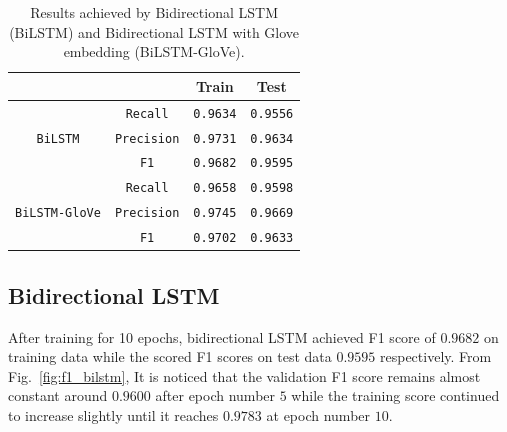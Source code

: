 \documentclass[sigconf, nonacm, natbib, screen, balance=False]{acmart}
\begin{document}
\begin{table}
  \caption{Results achieved by Bidirectional LSTM (BiLSTM) and Bidirectional LSTM with Glove embedding (BiLSTM-GloVe).}
  \label{tbl:results_compare}
  \begin{tabular}{c|c|c|c}  
    \hline
    \verb!! & \verb!! & Train  & Test \\\hline
    \verb!! & \verb!Recall! & \verb!0.9634!  & \verb!0.9556! \\
    \verb!BiLSTM! & \verb!Precision!  & \verb!0.9731! & \verb!0.9634! \\
    \verb!! & \verb!F1! & \verb!0.9682!  & \verb!0.9595!\\\hline
    \verb!! & \verb!Recall! & \verb!0.9658!  & \verb!0.9598! \\
    \verb!BiLSTM-GloVe! &  \verb!Precision! & \verb!0.9745!  & \verb!0.9669! \\
    \verb!! &  \verb!F1! & \verb!0.9702! & \verb!0.9633!  \\\hline
  \end{tabular}
\end{table}

\subsection{Bidirectional LSTM}
After training for 10 epochs, bidirectional LSTM achieved F1 score of $0.9682$ on training data while the scored F1 scores on test data  $0.9595$ respectively. From Fig.~\ref{fig:f1_bilstm}, It is noticed that the validation F1 score remains almost constant around $0.9600$ after epoch number $5$ while the training score continued to increase slightly until it reaches $0.9783$ at epoch number $10$.
\end{document}
